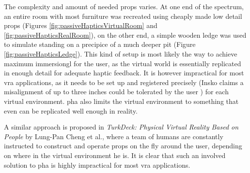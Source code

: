 The complexity and amount of needed props varies. At one end of the spectrum, an entire room with most furniture was recreated using cheaply made low detail props (Figures \autoref{fig:passiveHapticsVirtualRoom} and \autoref{fig:passiveHapticsRealRoom}), on the other end, a simple wooden ledge was used to simulate standing on a precipice of a much deeper pit (Figure \autoref{fig:passiveHapticsLedge}).
\newline
This kind of setup is most likely the way to achieve maximum \gls{immersiongl} for the user, as the virtual world is essentially replicated in enough detail for adequate haptic feedback. It is however impractical for most \gls{vra} applications, as it needs to be set up and registered precisely (Insko claims a misalignment of up  to three inches could be tolerated by the user \autocite[p. ~63]{passiveHaptics}) for each virtual environment. \Gls{pha} also limits the virtual environment to something that even can be replicated well enough in reality.
\newline

A similar approach is proposed in \textit{TurkDeck: Physical Virtual Reality Based on People} \autocite{turkDeck} by Lung-Pan Cheng et al., where a team of humans are constantly instructed to construct and operate props on the fly around the user, depending on where in the virtual environment he is. It is clear that such an involved solution to \gls{pha} is highly impractical for most \gls{vra} applications.
